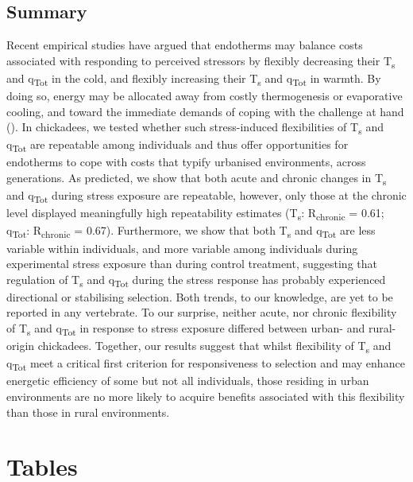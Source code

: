 \documentclass[12pt]{article}
\begin{document}
\subsection{Summary}
\vspace{0.5cm}

\noindent Recent empirical studies have argued that endotherms may balance costs associated with responding to perceived stressors by flexibly decreasing their T\textsubscript{s} and q\textsubscript{Tot} in the cold, and flexibly increasing their T\textsubscript{s} and q\textsubscript{Tot} in warmth. By doing so, energy may be allocated away from costly thermogenesis or evaporative cooling, and toward the immediate demands of coping with the challenge at hand (\citealt{robertson_2020a}). In chickadees, we tested whether such stress-induced flexibilities of T\textsubscript{s} and q\textsubscript{Tot} are repeatable among individuals and thus offer opportunities for endotherms to cope with costs that typify urbanised environments, across generations. As predicted, we show that both acute and chronic changes in T\textsubscript{s} and q\textsubscript{Tot} during stress exposure are repeatable, however, only those at the chronic level displayed meaningfully high repeatability estimates (T\textsubscript{s}: R\textsubscript{chronic} = 0.61; q\textsubscript{Tot}: R\textsubscript{chronic} = 0.67). Furthermore, we show that both T\textsubscript{s} and q\textsubscript{Tot} are less variable within individuals, and more variable among individuals during experimental stress exposure than during control treatment, suggesting that regulation of T\textsubscript{s} and q\textsubscript{Tot} during the stress response has probably experienced directional or stabilising selection. Both trends, to our knowledge, are yet to be reported in any vertebrate. To our surprise, neither acute, nor chronic flexibility of T\textsubscript{s} and q\textsubscript{Tot} in response to stress exposure differed between urban- and rural-origin chickadees. Together, our results suggest that whilst flexibility of T\textsubscript{s} and q\textsubscript{Tot} meet a critical first criterion for responsiveness to selection and may enhance energetic efficiency of some but not all individuals, those residing in urban environments are no more likely to acquire benefits associated with this flexibility than those in rural environments.

\nolinenumbers

\clearpage

\section*{Tables}
\end{document}
